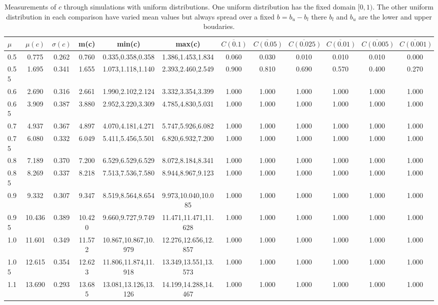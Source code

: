 \begin{table*}[h!]
\begin{center}
\begin{tabular}{| l | c | c | c | c | c | c | c | c | c | c | c |}\hline
$\mu$ & $\mu(c)$ & $\sigma(c)$ & m(c) & min(c) & max(c) & $\overline{C(0.1)}$ & $\overline{C(0.05)}$ & $\overline{C(0.025)}$ & $\overline{C(0.01)}$ & $\overline{C(0.005)}$ & $\overline{C(0.001)}$ \\\hline
0.5 & 0.775 & 0.262 & 0.760 & 0.335,0.358,0.358 & 1.386,1.453,1.834  & 0.060  & 0.030  & 0.010  & 0.010  & 0.010  & 0.000 \\\hline
0.55 & 1.695 & 0.341 & 1.655 & 1.073,1.118,1.140 & 2.393,2.460,2.549  & 0.900  & 0.810  & 0.690  & 0.570  & 0.400  & 0.270 \\\hline
0.6 & 2.690 & 0.316 & 2.661 & 1.990,2.102,2.124 & 3.332,3.354,3.399  & 1.000  & 1.000  & 1.000  & 1.000  & 1.000  & 1.000 \\\hline
0.65 & 3.909 & 0.387 & 3.880 & 2.952,3.220,3.309 & 4.785,4.830,5.031  & 1.000  & 1.000  & 1.000  & 1.000  & 1.000  & 1.000 \\\hline
0.7 & 4.937 & 0.367 & 4.897 & 4.070,4.181,4.271 & 5.747,5.926,6.082  & 1.000  & 1.000  & 1.000  & 1.000  & 1.000  & 1.000 \\\hline
0.75 & 6.080 & 0.332 & 6.049 & 5.411,5.456,5.501 & 6.820,6.932,7.200  & 1.000  & 1.000  & 1.000  & 1.000  & 1.000  & 1.000 \\\hline
0.8 & 7.189 & 0.370 & 7.200 & 6.529,6.529,6.529 & 8.072,8.184,8.341  & 1.000  & 1.000  & 1.000  & 1.000  & 1.000  & 1.000 \\\hline
0.85 & 8.269 & 0.337 & 8.218 & 7.513,7.536,7.580 & 8.944,8.967,9.123  & 1.000  & 1.000  & 1.000  & 1.000  & 1.000  & 1.000 \\\hline
0.9 & 9.332 & 0.307 & 9.347 & 8.519,8.564,8.654 & 9.973,10.040,10.085  & 1.000  & 1.000  & 1.000  & 1.000  & 1.000  & 1.000 \\\hline
0.95 & 10.436 & 0.389 & 10.420 & 9.660,9.727,9.749 & 11.471,11.471,11.628  & 1.000  & 1.000  & 1.000  & 1.000  & 1.000  & 1.000 \\\hline
1.0 & 11.601 & 0.349 & 11.572 & 10.867,10.867,10.979 & 12.276,12.656,12.857  & 1.000  & 1.000  & 1.000  & 1.000  & 1.000  & 1.000 \\\hline
1.05 & 12.615 & 0.354 & 12.623 & 11.806,11.874,11.918 & 13.349,13.551,13.573  & 1.000  & 1.000  & 1.000  & 1.000  & 1.000  & 1.000 \\\hline
1.1 & 13.690 & 0.293 & 13.685 & 13.081,13.126,13.126 & 14.199,14.288,14.467  & 1.000  & 1.000  & 1.000  & 1.000  & 1.000  & 1.000 \\\hline
\end{tabular}
\caption{Measurements of $c$ through simulations
with uniform distributions.
One uniform distribution has the fixed domain $[0,1)$.
The other uniform distribution in each comparison
have varied mean values but always
spread over a fixed $b=b_u-b_l$ there $b_l$ and $b_u$ are the lower and upper boudaries.}
\end{center}
\end{table*}